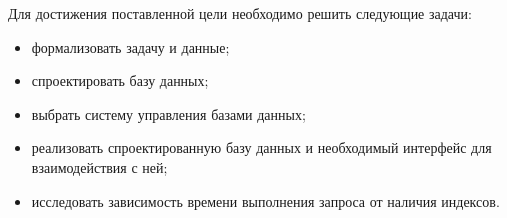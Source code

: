 Для достижения поставленной цели необходимо решить следующие задачи:
\begin{itemize}[left=0.49cm, label*=---]
    \item формализовать задачу и данные;
    \item спроектировать базу данных;
    \item выбрать систему управления базами данных;
    \item реализовать спроектированную базу данных и необходимый интерфейс для взаимодействия с ней;
    \item исследовать зависимость времени выполнения запроса от наличия индексов.
\end{itemize}
